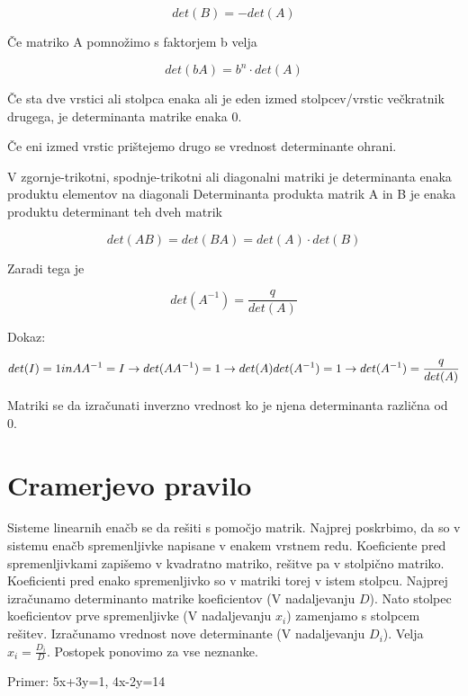 \documentclass[12pt]{report}
\begin{document}
\[det(B) = -det(A)\]

Če matriko A pomnožimo s faktorjem b velja

\[det(bA) = b^n \cdot det(A)\]

Če sta dve vrstici ali stolpca enaka ali je eden izmed stolpcev/vrstic večkratnik drugega, je determinanta matrike enaka 0.

Če eni izmed vrstic prištejemo drugo se vrednost determinante ohrani.

V zgornje-trikotni, spodnje-trikotni ali diagonalni matriki je determinanta enaka produktu elementov na diagonali
\pagebreak
Determinanta produkta matrik A in B je enaka produktu determinant teh dveh matrik

\[det(AB) = det(BA) = det(A) \cdot det(B)\]

Zaradi tega je 

\[det(A^{-1}) = \frac{q}{det(A)}\]

Dokaz:

\[det(I) = 1  \space in \space A A^{-1} = I \rightarrow det(A A^{-1}) = 1 \rightarrow det(A)det(A^{-1}) = 1 \rightarrow det(A^{-1}) = \frac{q}{det(A)}\]

Matriki se da izračunati inverzno vrednost ko je njena determinanta različna od 0.



\section*{Cramerjevo pravilo}

Sisteme linearnih enačb se da rešiti s pomočjo matrik. Najprej poskrbimo, da so v sistemu enačb spremenljivke napisane v enakem vrstnem redu. Koeficiente pred spremenljivkami zapišemo v kvadratno matriko, rešitve pa v stolpično matriko. Koeficienti pred enako spremenljivko so v matriki torej v istem stolpcu. Najprej izračunamo determinanto matrike koeficientov (V nadaljevanju $D$). Nato stolpec koeficientov prve spremenljivke (V nadaljevanju $x_i$) zamenjamo s stolpcem rešitev. Izračunamo vrednost nove determinante (V nadaljevanju $D_i$). Velja $x_i = \frac{D_i}{D}$. Postopek ponovimo za vse neznanke.

\pagebreak
Primer: 5x+3y=1, 4x-2y=14
\end{document}
